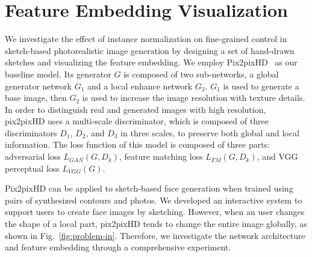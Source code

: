 \section{Feature Embedding Visualization}
\label{sec:visualize}

We investigate the effect of instance normalization on fine-grained control in sketch-based photorealistic image generation by designing a set of hand-drawn sketches and visualizing the feature embedding.
We employ Pix2pixHD~\cite{pix2pixhd} as our baseline model.
Its generator $G$ is composed of two sub-networks, a global generator network $G_1$ and a local enhance network $G_2$. 
$G_1$ is used to generate a base image, then $G_2$ is used to increase the image resolution with texture details. 
In order to distinguish real and generated images with high resolution, pix2pixHD uses a multi-scale discriminator, which is composed of three discriminators $D_1$, $D_2$, and $D_3$ in three scales, to preserve both global and local information. 
The loss function of this model is composed of three parts: adversarial loss $L_{GAN}(G,D_k)$, feature matching loss $L_{FM}(G,D_k)$, and VGG perceptual loss $L_{VGG}(G)$. 

Pix2pixHD can be applied to sketch-based face generation when trained using pairs of synthesized contours and photos. 
We developed an interactive system to support users to create face images by sketching. 
However, when an user changes the shape of a local part, pix2pixHD tends to change the entire image globally, as shown in Fig.~\ref{fig:problem-in}.
Therefore, we investigate the network architecture and feature embedding through a comprehensive experiment.


